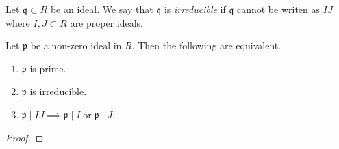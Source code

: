 \begin{definition}
	Let $\mathfrak q \subset R$ be an ideal.
	We say that $\mathfrak q$ is \emph{irreducible}
	if $\mathfrak q$ cannot be writen as $IJ$ where $I, J \subset R$
	are proper ideals.
\end{definition}

\begin{lemma}[]
	Let $\mathfrak p$ be a non-zero ideal in $R$.
	Then the following are equivalent.
	\begin{enumerate}
		\item $\mathfrak p$ is prime.
		\item $\mathfrak p$ is irreducible.
		\item $\mathfrak p \mid IJ \implies \mathfrak p \mid I
			\;\text{or}\; \mathfrak p \mid J$.
	\end{enumerate}
\end{lemma}

\begin{proof}
\end{proof}
